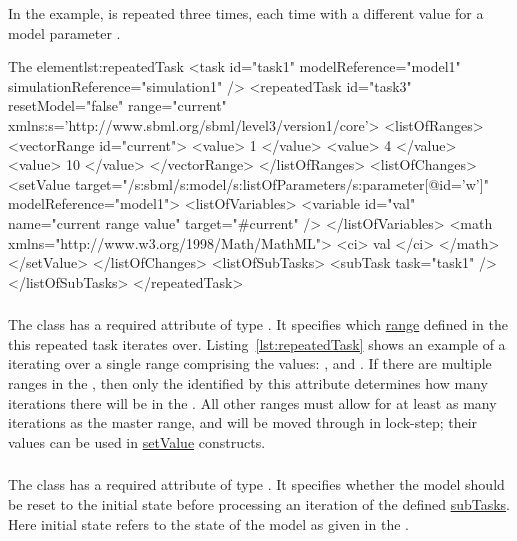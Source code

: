 In the example,  is repeated three times, each time with a different value for a model parameter .
\begin{myXmlLst}{The  element}{lst:repeatedTask}
<task id="task1" modelReference="model1" simulationReference="simulation1" />
<repeatedTask id="task3" resetModel="false" range="current"
    xmlns:s='http://www.sbml.org/sbml/level3/version1/core'>
  <listOfRanges>
    <vectorRange id="current"> 
        <value> 1 </value> 
        <value> 4 </value> 
        <value> 10 </value> 
    </vectorRange> 
  </listOfRanges>
  <listOfChanges>
     <setValue target="/s:sbml/s:model/s:listOfParameters/s:parameter[@id='w']" modelReference="model1">
       <listOfVariables> 
         <variable id="val" name="current range value" target="#current" /> 
       </listOfVariables> 
       <math xmlns="http://www.w3.org/1998/Math/MathML"> 
         <ci> val </ci> 
       </math> 
     </setValue> 
  </listOfChanges>
  <listOfSubTasks>
    <subTask task="task1" />
  </listOfSubTasks>
</repeatedTask>
\end{myXmlLst}
 
\subsubsection{}
\label{sec:rangeAttribute}
The  class has a required attribute  of type .
It specifies which \hyperref[sec:listOfRanges]{range} defined in the  this repeated task iterates over.
Listing~\ref{lst:repeatedTask} shows an example of a  iterating over a single range comprising the values: ,  and .
If there are multiple ranges in the , then only the  identified by this attribute determines how many iterations there will be in the .
All other ranges must allow for at least as many iterations as the master range, and will be moved through in lock-step; their values can be used in \hyperref[class:setValue]{setValue} constructs.

\subsubsection{}
\label{sec:resetModel}
The  class has a required attribute  of type . It specifies whether the model should be reset to the initial state before processing an iteration of the defined \hyperref[class:subTask]{subTasks}. Here initial state refers to the state of the model as given in the .

